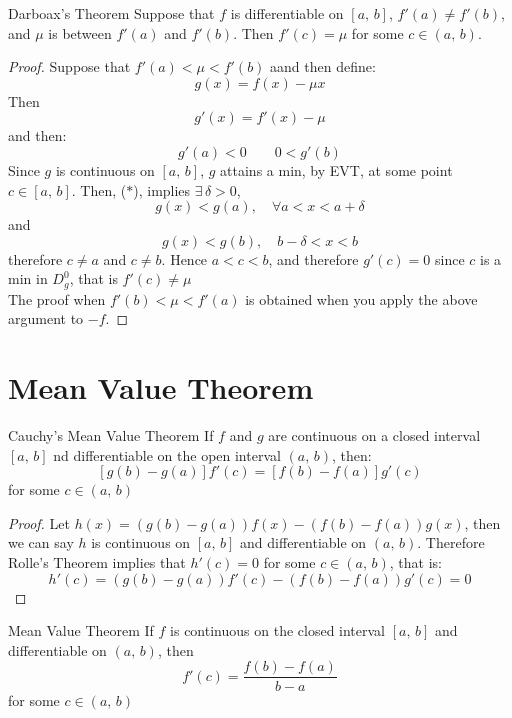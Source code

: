 \documentclass{article}
\renewcommand{\d}{\delta}
\newcommand{\ex}{\exists\,}
\begin{document}
{{{{\noindent\begin{theorem}{Darboax's Theorem}{}
  Suppose that $f$ is differentiable on $[a,\, b]$, $f'(a)\neq f'(b)$, and $\mu$ is between $f'(a)$ and $f'(b)$. Then $f'(c) = \mu$ for some $c\in (a,\, b)$.
\end{theorem}\vspace{10pt}
\begin{proof}
  Suppose that $f'(a) < \mu < f'(b)$ aand then define:
  $$ g(x) = f(x) - \mu x $$
  Then
  $$ g'(x) = f'(x) - \mu $$
  and then:
  \begin{equation}
    g'(a) < 0 \qquad 0 < g'(b) \tag{$*$}
  \end{equation}
  Since $g$ is continuous on $[a,\, b]$, $g$ attains a min, by EVT, at some point $c\in [a,\, b]$. Then, ($*$), implies $\ex \d > 0$,
  $$ g(x) < g(a), \quad\forall a < x < a + \d $$
  and
  $$ g(x) < g(b), \quad b - \d < x < b $$
  therefore $c\neq a$ and $c \neq b$. Hence $a < c < b$, and therefore $g'(c) = 0$ since $c$ is a min in $D_g^0$, that is $f'(c)\neq \mu$\\
  The proof when $f'(b)<\mu < f'(a)$ is obtained when you apply the above argument to $-f$.
\end{proof}

\section{Mean Value Theorem}

\noindent\begin{theorem}{Cauchy's Mean Value Theorem}{}
  If $f$ and $g$ are continuous on a closed interval $[a,\, b]$ nd differentiable on the open interval $(a,\, b)$, then:
  $$ [g(b) - g(a)]f'(c) = [f(b) - f(a)]g'(c) $$
  for some $c\in (a,\, b)$
\end{theorem}\vspace{10pt}
\begin{proof}
  Let $h(x) = (g(b) - g(a))f(x)- (f(b) - f(a))g(x)$, then we can say $h$ is continuous on $[a,\, b]$ and differentiable on $(a,\, b)$. Therefore Rolle's Theorem implies that $h'(c) = 0$ for some $c\in (a,\, b)$, that is:
  $$ h'(c) = (g(b) - g(a))f'(c) - (f(b) - f(a))g'(c) = 0 $$
\end{proof}

\noindent\begin{theorem}{Mean Value Theorem}{}
  If $f$ is continuous on the closed interval $[a,\,b]$ and differentiable on $(a,\,b)$, then
  $$ f'(c) = \frac{f(b) - f(a)}{b - a} $$
  for some $c\in (a,\,b)$
\end{theorem}\vspace{10pt}
\begin{figure}[H]
  \centering
\end{figure}}}}}
\end{document}
